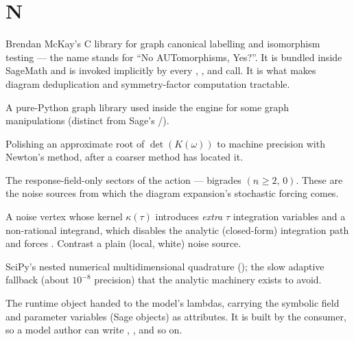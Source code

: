 \section*{N}
\begin{description}[leftmargin=0pt,style=nextline]

  \item[\code{nauty}] Brendan McKay's C library for graph canonical labelling and
        isomorphism testing --- the name stands for ``No AUTomorphisms, Yes?''. It is
        bundled inside SageMath and is invoked implicitly by every
        , , and 
        call. It is what makes diagram deduplication and symmetry-factor computation
        tractable.

  \item[\code{networkx}] A pure-Python graph library used inside the engine for some
        graph manipulations (distinct from Sage's /).

  \item[Newton refinement] Polishing an approximate root of $\det(K(\omega))$ to
        machine precision with Newton's method, after a coarser method has located
        it.

  \item[Noise kernel] The response-field-only sectors of the action --- bigrades
        $(n_{\tilde{}}\ge 2,\,0)$. These are the noise sources from which the diagram
        expansion's stochastic forcing comes.

  \item[NoiseSourceType / non-local cumulant kernel] A noise vertex whose kernel
        $\kappa(\tau)$ introduces \emph{extra} $\tau$ integration variables and a
        non-rational integrand, which disables the analytic (closed-form) integration
        path and forces . Contrast a plain (local, white) noise
        source.

  \item[\code{nquad}] SciPy's nested numerical multidimensional quadrature
        (); the slow adaptive fallback (about
        $10^{-8}$ precision) that the analytic machinery exists to avoid.

  \item[\code{ns} (NamespaceForFields)] The runtime object handed to the model's
        lambdas, carrying the symbolic field and parameter variables (Sage 
        objects) as attributes. It is built by the consumer, so a model author can
        write , , and so on.


\end{description}
